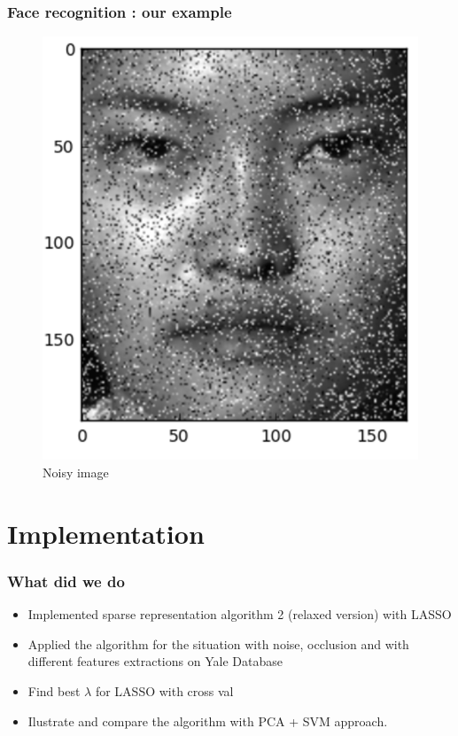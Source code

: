 \documentclass{beamer}
\begin{document}
\begin{frame}
\frametitle{Face recognition : our example}

			\begin{figure}[!ht]
			\begin{center}
			\includegraphics[scale=0.4]{noisy_face.png}
			\end{center}
			\caption{Noisy image}
			\label{fa}
			\end{figure}
\end{frame}

\section{Implementation}


\begin{frame}

		\frametitle{What did we do}
		
		\begin{itemize}
		\item Implemented sparse representation algorithm 2 (relaxed version) with LASSO
		\item Applied the algorithm for the situation with noise, occlusion and with different features extractions on Yale Database
		\item Find best $\lambda$ for LASSO with cross val
		\item Ilustrate and compare the algorithm with PCA + SVM approach.
		
		\end{itemize}
		
		
\end{frame}
		
\end{document}
